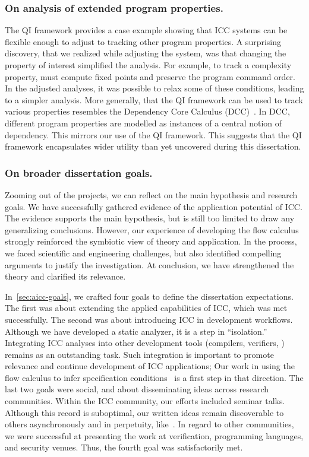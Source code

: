 \subsubsection*{On analysis of extended program properties.}
The QI framework provides a case example showing that ICC systems can be flexible enough to adjust to tracking other program properties.
A surprising discovery, that we realized while adjusting the system, was that changing the property of interest simplified the analysis.
For example, to track a complexity property, must compute fixed points and preserve the program command order.
In the adjusted analyses, it was possible to relax some of these conditions, leading to a simpler analysis.
More generally, that the QI framework can be used to track various properties resembles the Dependency Core Calculus (DCC)~\cite{abadi1999b}.
In DCC, different program properties are modelled as instances of a central notion of dependency.
This mirrors our use of the QI framework.
This suggests that the QI framework encapsulates wider utility than yet uncovered during this dissertation.

\subsubsection*{On broader dissertation goals.}
Zooming out of the projects, we can reflect on the main hypothesis and research goals.
We have successfully gathered evidence of the application potential of ICC.
The evidence supports the main hypothesis, but is still too limited to draw any generalizing conclusions.
However, our experience of developing the flow calculus strongly reinforced the symbiotic view of theory and application.
In the process, we faced scientific and engineering challenges, but also identified compelling arguments to justify the investigation.
At conclusion, we have strengthened the theory and clarified its relevance.

In~\autoref{sec:aicc-goals}, we crafted four goals to define the dissertation expectations.
The first was about extending the applied capabilities of ICC, which was met successfully.
The second was about introducing ICC in development workflows.
Although we have developed a static analyzer, it is a step in \enquote{isolation.}
Integrating ICC analyses into other development tools (compilers, verifiers, \etc) remains as an outstanding task.
Such integration is important to promote relevance and continue development of ICC {applications};
Our work in using the flow calculus to infer specification conditions~\cite{rusch2025} is a first step in that direction.
The last two goals were social, and about disseminating ideas across research communities.
Within the ICC community, our efforts included seminar talks.
Although this record is suboptimal, our written ideas remain discoverable to others asynchronously and in perpetuity, like~\cite{moyen2017}.
In regard to other communities, we were successful at presenting the work at verification, programming languages, and security venues.
Thus, the fourth goal was satisfactorily met.

